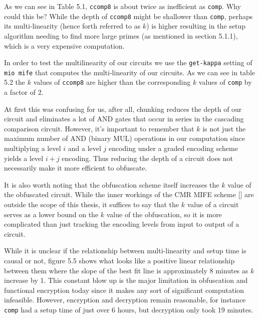 \documentclass[12pt,twoside]{reedthesis}
\begin{document}
\par As we can see in Table 5.1, \texttt{ccomp8} is about twice as inefficient as \texttt{comp}. Why could this be? While the depth of \texttt{ccomp8} might be shallower than \texttt{comp}, perhaps its multi-linearity (hence forth referred to as $k$) is higher resulting in the setup algorithm needing to find more large primes (as mentioned in section 5.1.1), which is a very expensive computation. 

\par In order to test the multilinearity of our circuits we use the \texttt{get-kappa} setting of \texttt{mio mife} that computes the multi-linearity of our circuits. As we can see in table 5.2 the $k$ values of \texttt{ccomp8} are higher than the corresponding $k$ values of \texttt{comp} by a factor of 2. 
\par At first this was confusing for us, after all, chunking reduces the depth of our circuit and eliminates a lot of AND gates that occur in series in the cascading comparison circuit. However, it's important to remember that $k$ is not just the maximum number of AND (binary MUL) operations in our computation since multiplying a level $i$ and a level $j$ encoding under a graded encoding scheme yields a level $i+j$ encoding. Thus reducing the depth of a circuit does not necessarily make it more efficient to obfuscate.
\par It is also worth noting that the obfuscation scheme itself increases the $k$ value of the obfuscated circuit. While the inner workings of the CMR MIFE scheme [\cite{5genc}] are outside the scope of this thesis, it suffices to say that the $k$ value of a circuit serves as a lower bound on the $k$ value of the obfuscation, so it is more complicated than just tracking the encoding levels from input to output of a circuit.
\par While it is unclear if the relationship between multi-linearity and setup time is causal or not, figure 5.5 shows what looks like a positive linear relationship between them where the slope of the best fit line is approximately 8 minutes as $k$ increase by 1. This constant blow up is the major limitation in obfuscation and functional encryption today since it makes any sort of significant computation infeasible. However, encryption and decryption remain reasonable, for instance \texttt{comp} had a setup time of just over 6 hours, but decryption only took 19 minutes. 
\end{document}

